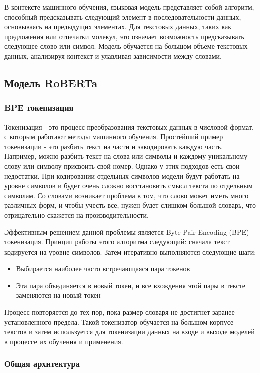 В контексте машинного обучения, языковая модель представляет собой алгоритм, способный предсказывать следующий элемент в последовательности данных, основываясь на предыдущих элементах. Для текстовых данных, таких как предложения или отпечатки молекул, это означает возможность предсказывать следующее слово или символ. Модель обучается на большом объеме текстовых данных, анализируя контекст и улавливая зависимости между словами. 


\subsection{Модель RoBERTa}

\subsubsection{BPE токенизация} %
Токенизация - это процесс преобразования текстовых данных в числовой формат, с которым работают методы машинного обучения. Простейший пример токенизации - это разбить текст на части и закодировать каждую часть. Например, можно разбить текст на слова или символы и каждому уникальному слову или символу присвоить свой номер. Однако у этих подходов есть свои недостатки. При кодировании отдельных символов модели будут работать на уровне символов и будет очень сложно восстановить смысл текста по отдельным символам. Со словами возникает проблема в том, что слово может иметь много различных форм, и чтобы учесть все, нужен будет слишком большой словарь, что отрицательно скажется на производительности.

Эффективным решением данной проблемы является Byte Pair Encoding (BPE) \cite{sennrich-etal-2016-neural} токенизация. Принцип работы этого алгоритма следующий: сначала текст кодируется на уровне символов. Затем итеративно выполняются следующие шаги: \begin{itemize} 
\item Выбирается наиболее часто встречающаяся пара токенов
\item Эта пара объединяется в новый токен, и все вхождения этой пары в тексте заменяются на новый токен
\end{itemize}
Процесс повторяется до тех пор, пока размер словаря не достигнет заранее установленного предела. Такой токенизатор обучается на большом корпусе текстов и затем используется для токенизации данных на входе и выходе моделей в процессе их обучения и применения.


\subsubsection{Общая архитектура} %


